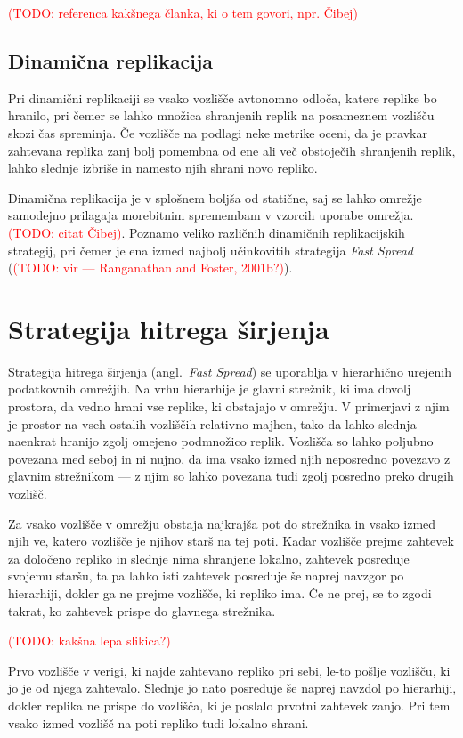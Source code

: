 \documentclass[a4paper, 12pt]{book}
\newcommand{\newterm}{\textit}
\newcommand{\TODO}[1]{\textcolor{red}{(TODO: #1)}}
\begin{document}
\TODO{referenca kakšnega članka, ki o tem govori, npr. Čibej}

\subsection{Dinamična replikacija}

Pri dinamični replikaciji se vsako vozlišče avtonomno odloča, katere
replike bo hranilo, pri čemer se lahko množica shranjenih replik na
posameznem vozlišču skozi čas spreminja. Če vozlišče na podlagi neke
metrike oceni, da je pravkar zahtevana replika zanj bolj pomembna od ene
ali več obstoječih shranjenih replik, lahko slednje izbriše in namesto
njih shrani novo repliko.

Dinamična replikacija je v splošnem boljša od statične, saj se lahko
omre\-žje samodejno prilagaja morebitnim spremembam v vzorcih uporabe omrežja.
\TODO{citat Čibej}. Poznamo veliko različnih dinamičnih replikacijskih
strategij, pri čemer je ena izmed najbolj učinkovitih strategija
\newterm{Fast Spread} (\TODO{vir --- Ranganathan and Foster, 2001b?}).


\section{Strategija hitrega širjenja}

Strategija hitrega širjenja (angl.~\textit{Fast Spread}) se uporablja v
hierarhično urejenih podatkovnih omrežjih. Na vrhu hierarhije je glavni
strežnik, ki ima dovolj prostora, da vedno hrani vse replike, ki obstajajo v
omrežju. V primerjavi z njim je prostor na vseh ostalih vozliščih relativno
majhen, tako da lahko slednja naenkrat hranijo zgolj omejeno podmnožico replik.
Vozlišča so lahko poljubno povezana med seboj in ni nujno, da ima vsako izmed
njih neposredno povezavo z glavnim strežnikom --- z njim so lahko povezana tudi
zgolj posredno preko drugih vozlišč.

Za vsako vozlišče v omrežju obstaja najkrajša pot do strežnika in vsako izmed
njih ve, katero vozlišče je njihov starš na tej poti. Kadar vozlišče prejme
zahtevek za določeno repliko in slednje nima shranjene lokalno, zahtevek
posreduje svojemu staršu, ta pa lahko isti zahtevek posreduje še naprej
navzgor po hierarhiji, dokler ga ne prejme vozlišče, ki repliko ima. Če ne
prej, se to zgodi takrat, ko zahtevek prispe do glavnega strežnika.

\TODO{kakšna lepa slikica?}

Prvo vozlišče v verigi, ki najde zahtevano repliko pri sebi, le-to pošlje
vozlišču, ki jo je od njega zahtevalo. Slednje jo nato posreduje še naprej
navzdol po hierarhiji, dokler replika ne prispe do vozlišča, ki je poslalo
prvotni zahtevek zanjo. Pri tem vsako izmed vozlišč na poti repliko tudi
lokalno shrani.
\end{document}
